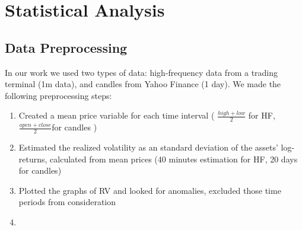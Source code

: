 \section{Statistical Analysis}
    \subsection{Data Preprocessing}
        In our work we used two types of data: high-frequency data from a 
        trading terminal (1m data), and candles from Yahoo Finance (1 day).
        We made the following preprocessing steps:
        \begin{enumerate}
            \item Created a mean price variable for each time interval ( $\frac{high+low}{2}$ for HF, $\frac{open+close}{2}$for candles )
            \item Estimated the realized volatility as an standard deviation of the assets' log-returns, calculated from mean prices (40 minutes estimation for HF, 20 days for candles)
            \item Plotted the graphs of RV and looked for anomalies, excluded those time periods from consideration
            \item 
        \end{enumerate}